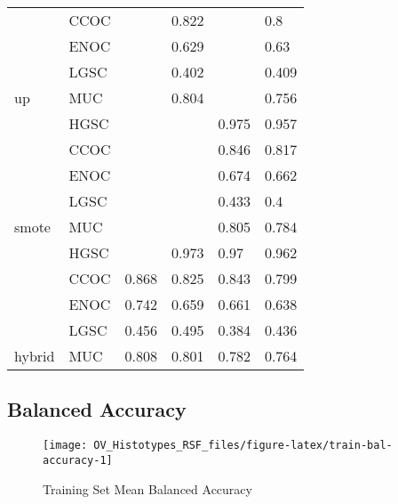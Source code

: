 \documentclass[
]{report}
\begin{document}
\begin{table}
\begin{tabular}[t]{l|l|l|l|l|l}
\cline{2-6}
 & CCOC & \cellcolor[HTML]{FFD700}{0.869} & 0.822 & \cellcolor[HTML]{FFD700}{0.87} & 0.8\\
\cline{2-6}
 & ENOC & \cellcolor[HTML]{FFD700}{0.734} & 0.629 & \cellcolor[HTML]{FFD700}{0.728} & 0.63\\
\cline{2-6}
 & LGSC & \cellcolor[HTML]{FFD700}{0.236} & 0.402 & \cellcolor[HTML]{FFD700}{0.394} & 0.409\\
\cline{2-6}
\multirow{-5}{*}{\raggedright\arraybackslash up} & MUC & \cellcolor[HTML]{FFD700}{0.835} & 0.804 & \cellcolor[HTML]{FFD700}{0.814} & 0.756\\
\cline{1-6}
 & HGSC & \cellcolor[HTML]{FFD700}{0.974} & \cellcolor[HTML]{FFD700}{0.973} & 0.975 & 0.957\\
\cline{2-6}
 & CCOC & \cellcolor[HTML]{FFD700}{0.833} & \cellcolor[HTML]{FFD700}{0.782} & 0.846 & 0.817\\
\cline{2-6}
 & ENOC & \cellcolor[HTML]{FFD700}{0.701} & \cellcolor[HTML]{FFD700}{0.588} & 0.674 & 0.662\\
\cline{2-6}
 & LGSC & \cellcolor[HTML]{FFD700}{0.285} & \cellcolor[HTML]{FFD700}{0.519} & 0.433 & 0.4\\
\cline{2-6}
\multirow{-5}{*}{\raggedright\arraybackslash smote} & MUC & \cellcolor[HTML]{FFD700}{0.827} & \cellcolor[HTML]{FFD700}{0.825} & 0.805 & 0.784\\
\cline{1-6}
 & HGSC & \cellcolor[HTML]{90ee90}{0.977} & 0.973 & 0.97 & 0.962\\
\cline{2-6}
 & CCOC & 0.868 & 0.825 & 0.843 & 0.799\\
\cline{2-6}
 & ENOC & 0.742 & 0.659 & 0.661 & 0.638\\
\cline{2-6}
 & LGSC & 0.456 & 0.495 & 0.384 & 0.436\\
\cline{2-6}
\multirow{-5}{*}{\raggedright\arraybackslash hybrid} & MUC & 0.808 & 0.801 & 0.782 & 0.764\\
\hline
\end{tabular}
\end{table}

\subsection{Balanced Accuracy}\label{balanced-accuracy-1}

\begin{figure}[H]

{\centering \texttt{[image: OV\_Histotypes\_RSF\_files/figure-latex/train-bal-accuracy-1]} 

}

\caption{Training Set Mean Balanced Accuracy}\label{fig:train-bal-accuracy}
\end{figure}
\end{document}
